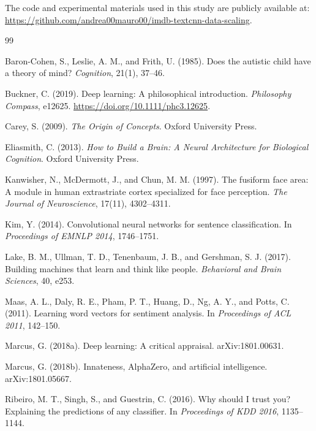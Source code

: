 \documentclass[11pt]{article}
\begin{document}
The code and experimental materials used in this study are publicly available at:
\url{https://github.com/andrea00mauro00/imdb-textcnn-data-scaling}.

\newpage

\begin{thebibliography}{99}

Baron-Cohen, S., Leslie, A. M., and Frith, U. (1985).
Does the autistic child have a theory of mind?
\textit{Cognition}, 21(1), 37--46.

Buckner, C. (2019).
Deep learning: A philosophical introduction.
\textit{Philosophy Compass}, e12625.
\url{https://doi.org/10.1111/phc3.12625}.

Carey, S. (2009).
\textit{The Origin of Concepts}.
Oxford University Press.

Eliasmith, C. (2013).
\textit{How to Build a Brain: A Neural Architecture for Biological Cognition}.
Oxford University Press.

Kanwisher, N., McDermott, J., and Chun, M. M. (1997).
The fusiform face area: A module in human extrastriate cortex specialized for face perception.
\textit{The Journal of Neuroscience}, 17(11), 4302--4311.

Kim, Y. (2014).
Convolutional neural networks for sentence classification.
In \textit{Proceedings of EMNLP 2014}, 1746--1751.

Lake, B. M., Ullman, T. D., Tenenbaum, J. B., and Gershman, S. J. (2017).
Building machines that learn and think like people.
\textit{Behavioral and Brain Sciences}, 40, e253.

Maas, A. L., Daly, R. E., Pham, P. T., Huang, D., Ng, A. Y., and Potts, C. (2011).
Learning word vectors for sentiment analysis.
In \textit{Proceedings of ACL 2011}, 142--150.

Marcus, G. (2018a).
Deep learning: A critical appraisal.
arXiv:1801.00631.

Marcus, G. (2018b).
Innateness, AlphaZero, and artificial intelligence.
arXiv:1801.05667.

Ribeiro, M. T., Singh, S., and Guestrin, C. (2016).
Why should I trust you? Explaining the predictions of any classifier.
In \textit{Proceedings of KDD 2016}, 1135--1144.

\end{thebibliography}
\end{document}
